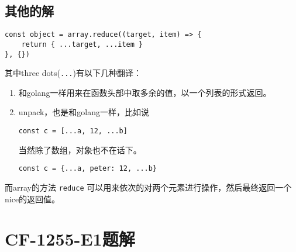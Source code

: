 \subsection{其他的解}

\begin{lstlisting}
const object = array.reduce((target, item) => {
    return { ...target, ...item }
}, {})
\end{lstlisting}

其中three dots(\verb|...|)有以下几种翻译：
\begin{enumerate}
\item 和golang一样用来在函数头部中取多余的值，以一个列表的形式返回。
\item unpack，也是和golang一样，比如说
\begin{lstlisting}
const c = [...a, 12, ...b]
\end{lstlisting}

当然除了数组，对象也不在话下。
\begin{lstlisting}
const c = {...a, peter: 12, ...b}
\end{lstlisting}
\end{enumerate}
 
而array的方法 \verb|reduce| 可以用来依次的对两个元素进行操作，然后最终返回一个
nice的返回值。


\section{CF-1255-E1题解}

